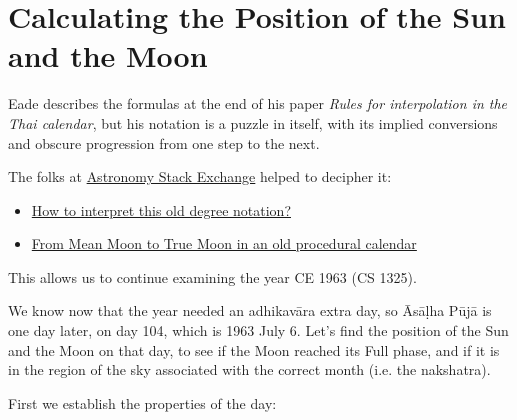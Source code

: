 \documentclass[11pt,oneside]{memoir-article}
\begin{document}
\label{adhikavara-years-end}

\section{Calculating the Position of the Sun and the Moon}
\label{sec-4-5}
\label{calculating-the-sun-and-moon}

Eade describes the formulas at the end of his paper \emph{Rules for interpolation in
the Thai calendar}\autocite{eade2000rules}, but his notation is a puzzle in itself,
with its implied conversions and obscure progression from one step to the next.

The folks at \href{http://astronomy.stackexchange.com/}{Astronomy Stack Exchange} helped to decipher it:

\begin{itemize}
\item \href{http://astronomy.stackexchange.com/questions/11753/how-to-interpret-this-old-degree-notation}{How to interpret this old degree notation?}
\item \href{http://astronomy.stackexchange.com/questions/12052/from-mean-moon-to-true-moon-in-an-old-procedural-calendar}{From Mean Moon to True Moon in an old procedural calendar}
\end{itemize}

This allows us to continue examining the year CE 1963 (CS 1325).

We know now that the year needed an adhikavāra extra day, so Āsāḷha Pūjā is one
day later, on day 104, which is 1963 July 6. Let's find the position of the Sun
and the Moon on that day, to see if the Moon reached its Full phase, and if it
is in the region of the sky associated with the correct month (i.e. the
nakshatra).

First we establish the properties of the day:
\end{document}
